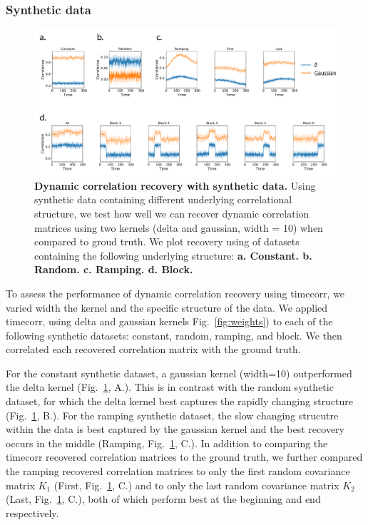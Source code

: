 \documentclass[english]{article}
\begin{document}
\subsubsection*{Synthetic data}


\begin{figure}
  \centering
  \includegraphics[width=\textwidth]{figs/synthetic_data.pdf}
  \caption{\textbf{Dynamic correlation recovery with synthetic data. } Using synthetic data containing different
    underlying correlational structure,
   we test how well we can recover dynamic correlation matrices using two kernels (delta and gaussian,
    width = 10) when compared to groud truth.  We plot recovery using of datasets containing the
    following underlying structure:
    \textbf{a. Constant. b. Random. c. Ramping.  d. Block.}}
  \label{fig:synthetic_data}
\end{figure}

To assess the performance of dynamic correlation recovery using
timecorr, we varied width the kernel and the specific structure of the data. We applied timecorr, using delta and gaussian kernels
Fig.~\ref{fig:weights}) to each of the following  
synthetic datasets: constant, random, ramping, and block.  We then correlated each recovered
correlation matrix with the ground truth. 

For the constant synthetic dataset, a gaussian kernel (width=10)
outperformed the delta kernel (Fig.~\ref{fig:synthetic_data},  A.).  This is in contrast with the random
synthetic dataset, for which the delta kernel best captures the
rapidly changing structure (Fig.~\ref{fig:synthetic_data},  B.). For
the ramping synthetic dataset, the slow changing strucutre within the
data is best
captured by the gaussian kernel and the best recovery occurs in the
middle (Ramping, Fig.~\ref{fig:synthetic_data},
C.). In addition to comparing the timecorr recovered correlation
matrices to the ground truth, we
further compared the ramping recovered correlation matrices to only the first random covariance matrix $K_{1}$
(First, Fig.~\ref{fig:synthetic_data},  C.) and to only the last
random covariance matrix $K_{2}$ (Last, Fig.~\ref{fig:synthetic_data},
C.), both of which perform best at the beginning and end respectively.
\end{document}
